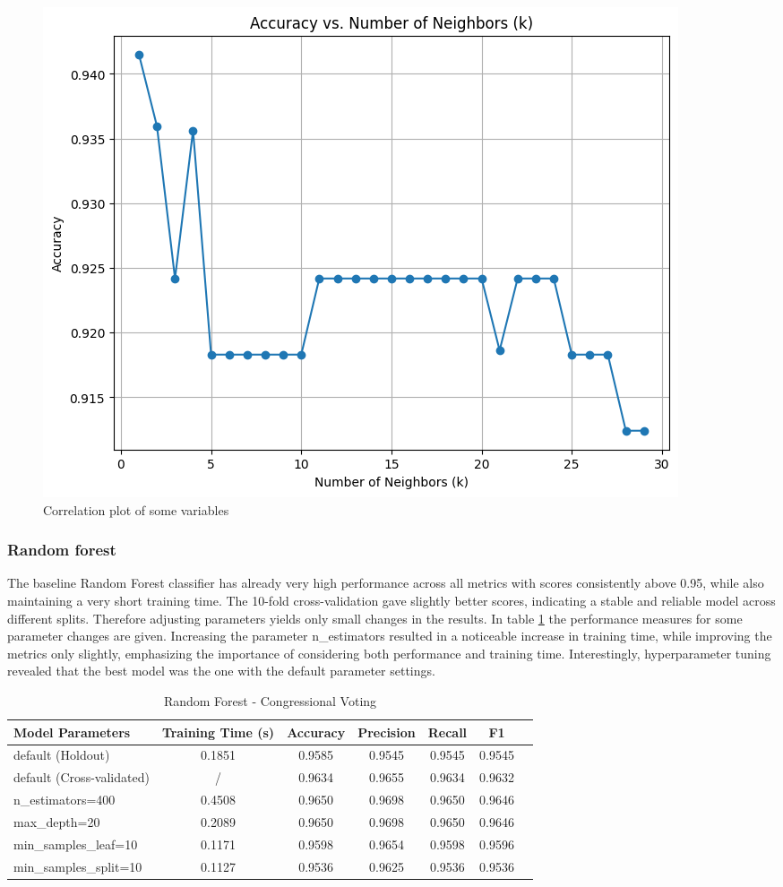 \documentclass{article}
\begin{document}
\begin{figure}[H]
\centering
\includegraphics[width=0.8\linewidth]{voting_optimalK.png}
\caption{\label{fig:votingOptimalk} Correlation plot of some variables}
\end{figure}

\subsubsection*{Random forest}
The baseline Random Forest classifier has already very high performance across all metrics with scores consistently above 0.95, while also maintaining a very short training time. The 10-fold cross-validation gave slightly better scores, indicating a stable and reliable model across different splits. Therefore adjusting parameters yields only small changes in the results. In table \ref{table:Random Forest - Congressional Voting} the performance measures for some parameter changes are given. Increasing the parameter n\_estimators resulted in a noticeable increase in training time, while improving the metrics only slightly, emphasizing the importance of considering both performance and training time. Interestingly, hyperparameter tuning revealed that the best model was the one with the default parameter settings.

\begin{table}[H]
\centering
\begin{tabular}{l|c|c|c|c|c|c}
\textbf{Model Parameters} & \textbf{Training Time (s)} & \textbf{Accuracy} & \textbf{Precision} & \textbf{Recall} & \textbf{F1} \\\hline
default (Holdout) & 0.1851  & 0.9585 & 0.9545 & 0.9545 & 0.9545 \\
default (Cross-validated) & /  & 0.9634 & 0.9655 & 0.9634 & 0.9632 \\
n\_estimators=400 & 0.4508  & 0.9650 & 0.9698 & 0.9650  & 0.9646 \\
max\_depth=20 & 0.2089  & 0.9650 & 0.9698 & 0.9650 & 0.9646 \\
min\_samples\_leaf=10 & 0.1171  & 0.9598 & 0.9654 & 0.9598 & 0.9596 \\
min\_samples\_split=10 & 0.1127  & 0.9536 & 0.9625 & 0.9536 & 0.9536 \\
\end{tabular}
\caption{Random Forest - Congressional Voting}
\label{table:Random Forest - Congressional Voting}
\end{table}
\end{document}
